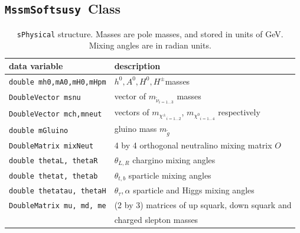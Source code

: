 \documentclass{article}
\def\code#1{\small{\tt #1}\normalsize}
\begin{document}
\subsection{\code{MssmSoftsusy}~Class \label{sec:mssmsoftsusy}}

\begin{table}\begin{center}\begin{tabular}{ll}
data variable & description \\ \hline
\code{double mh0,mA0,mH0,mHpm} & $h^0, A^0, H^0,
H^\pm$masses \\
\code{DoubleVector msnu} & vector of $m_{{\tilde \nu}_{i=1 \ldots 3}}$ masses \\
\code{DoubleVector mch,mneut} & vectors of $m_{{\chi^\pm}_{i=1 \ldots 2}}$, 
$m_{{\chi^0}_{i=1 \ldots 4}}$ respectively \\
\code{double mGluino} & gluino mass $m_{\tilde g}$ \\
\code{DoubleMatrix mixNeut} & 4 by 4 orthogonal neutralino mixing matrix $O$
\\
\code{double thetaL, thetaR} & $\theta_{L, R}$ chargino mixing angles \\
\code{double thetat, thetab} & $\theta_{t,b}$ sparticle mixing angles \\
\code{double thetatau, thetaH} & $\theta_{\tau}, \alpha$ sparticle and Higgs
mixing angles \\
\code{DoubleMatrix mu, md, me} & (2 by 3) matrices of up squark, down squark
and\\
 &  charged slepton masses \\
\end{tabular}
\caption{ \label{tab:sphys}\code{sPhysical} structure. Masses are pole masses, and stored in units of
GeV. Mixing angles are in radian units.}\end{center}\end{table}
\end{document}
